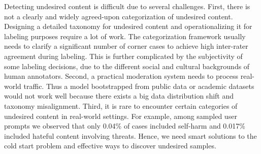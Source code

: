 \documentclass[letterpaper]{article} %
\begin{document}
Detecting undesired content is difficult due to several challenges. 
First, there is not a clearly and widely agreed-upon categorization of undesired content. Designing a detailed taxonomy for undesired content and operationalizing it for labeling purposes require a lot of work. The categorization framework usually needs to clarify a significant number of corner cases to achieve high inter-rater agreement during labeling. This is further complicated by the subjectivity of some labeling decisions, due to the different social and cultural backgrounds of human annotators. 
Second, a practical moderation system needs to process real-world traffic. Thus a model bootstrapped from public data or academic datasets would not work well because there exists a big data distribution shift and taxonomy misalignment.
%
Third, it is rare to encounter certain categories of undesired content in real-world settings. For example, among sampled user prompts we observed that only 0.04\% of cases included self-harm and 0.017\% included hateful content involving threats. Hence, we need smart solutions to the cold start problem and effective ways to discover undesired samples. 
\end{document}

